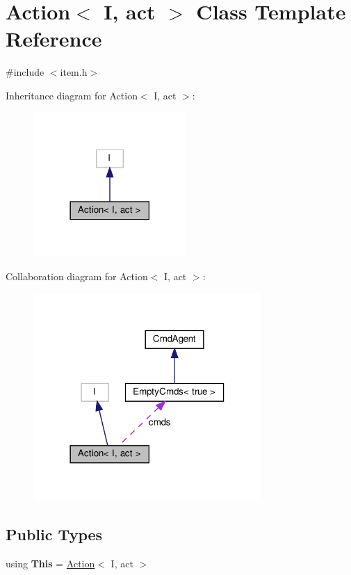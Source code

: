 \hypertarget{classAction}{}\section{Action$<$ I, act $>$ Class Template Reference}
\label{classAction}


{\ttfamily \#include $<$item.\+h$>$}



Inheritance diagram for Action$<$ I, act $>$\+:\nopagebreak
\begin{figure}[H]
\begin{center}
\leavevmode
\includegraphics[width=165pt]{classAction__inherit__graph}
\end{center}
\end{figure}


Collaboration diagram for Action$<$ I, act $>$\+:\nopagebreak
\begin{figure}[H]
\begin{center}
\leavevmode
\includegraphics[width=246pt]{classAction__coll__graph}
\end{center}
\end{figure}
\subsection*{Public Types}
\begin{DoxyCompactItemize}
\item 
\mbox{\label{classAction_a3a2c0d6cb66ded45aad64c9a1d82fd90}} 
using {\bfseries This} = \hyperlink{classAction}{Action}$<$ I, act $>$
\end{DoxyCompactItemize}
